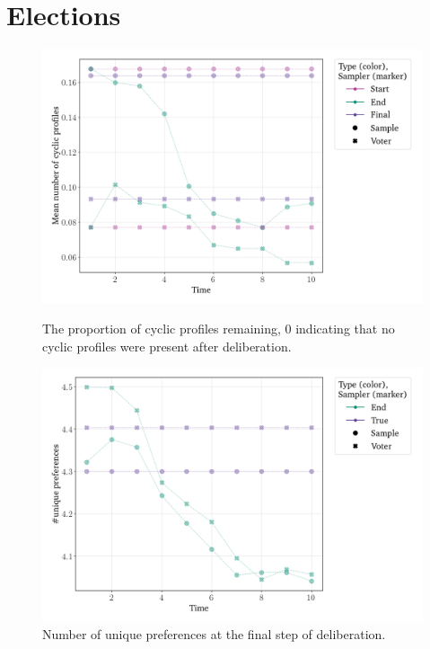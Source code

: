 \documentclass[11pt, oneside, dvipsnames]{Thesis} %
\begin{document}
\section{Elections}

\begin{figure}[htbp]
	\centering
	\begin{minipage}{0.45\textwidth}
		\centering
		\includegraphics[width=\textwidth]{Figures/delib_Mean Number of Cyclic Profiles.png}
		\caption{The proportion of cyclic profiles remaining, 0 indicating that no cyclic profiles were present after deliberation.}
		\label{fig:degroot_cyclic}
	\end{minipage}\hfill
	\begin{minipage}{0.45\textwidth}
		\centering
		\vspace{-9pt}
		\includegraphics[width=\textwidth]{Figures/delib_number_Unique Preferences.png}
		\caption{Number of unique preferences at the final step of deliberation.}
		\label{fig:degroot_count}
	\end{minipage}


\end{figure}
\end{document}
